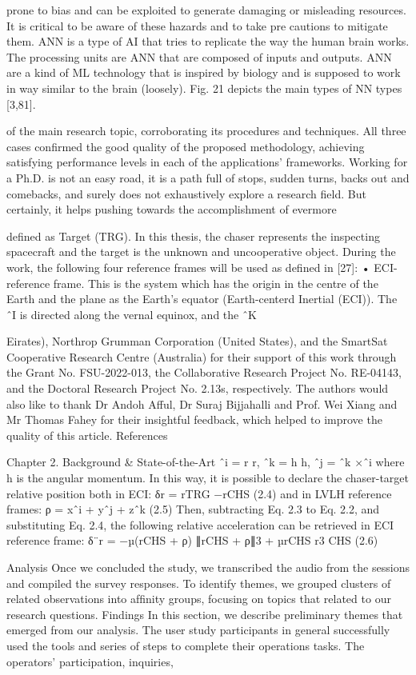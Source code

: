 \documentclass[a4paper,12pt]{article}
\begin{document}
prone to bias and can be exploited to generate damaging or misleading 
resources. It is critical to be aware of these hazards and to take pre­
cautions to mitigate them. ANN is a type of AI that tries to replicate the 
way the human brain works. The processing units are ANN that are 
composed of inputs and outputs. ANN are a kind of ML technology that is 
inspired by biology and is supposed to work in way similar to the brain 
(loosely). Fig. 21 depicts the main types of NN types [3,81].

of the main research topic, corroborating its procedures and techniques. All
three cases confirmed the good quality of the proposed methodology, achieving
satisfying performance levels in each of the applications’ frameworks.
Working for a Ph.D. is not an easy road, it is a path full of stops, sudden turns,
backs out and comebacks, and surely does not exhaustively explore a research
field. But certainly, it helps pushing towards the accomplishment of evermore

defined as Target (TRG). In this thesis, the chaser represents the inspecting
spacecraft and the target is the unknown and uncooperative object. During
the work, the following four reference frames will be used as defined in [27]:
• ECI-reference frame. This is the system which has the origin in the
centre of the Earth and the plane as the Earth’s equator (Earth-centerd
Inertial (ECI)). The ˆI is directed along the vernal equinox, and the ˆK

Eirates), Northrop Grumman Corporation (United States), and the 
SmartSat Cooperative Research Centre (Australia) for their support of 
this work through the Grant No. FSU-2022-013, the Collaborative 
Research Project No. RE-04143, and the Doctoral Research Project No. 
2.13s, respectively. The authors would also like to thank Dr Andoh Afful, 
Dr Suraj Bijjahalli and Prof. Wei Xiang and Mr Thomas Fahey for their 
insightful feedback, which helped to improve the quality of this article. 
References

Chapter 2.
Background & State-of-the-Art
ˆi = r
r, ˆk = h
h, ˆj = ˆk ×ˆi
where h is the angular momentum. In this way, it is possible to declare the
chaser-target relative position both in ECI:
δr = rTRG −rCHS
(2.4)
and in LVLH reference frames:
ρ = xˆi + yˆj + zˆk
(2.5)
Then, subtracting Eq. 2.3 to Eq. 2.2, and substituting Eq. 2.4, the following
relative acceleration can be retrieved in ECI reference frame:
δ¨r = −µ(rCHS + ρ)
∥rCHS + ρ∥3 + µrCHS
r3
CHS
(2.6)

Analysis
Once we concluded the study, we transcribed the audio from
the sessions and compiled the survey responses. To identify
themes, we grouped clusters of related observations into
afﬁnity groups, focusing on topics that related to our research
questions.
Findings
In this section, we describe preliminary themes that emerged
from our analysis.
The user study participants in general
successfully used the tools and series of steps to complete
their operations tasks. The operators’ participation, inquiries,
\end{document}
